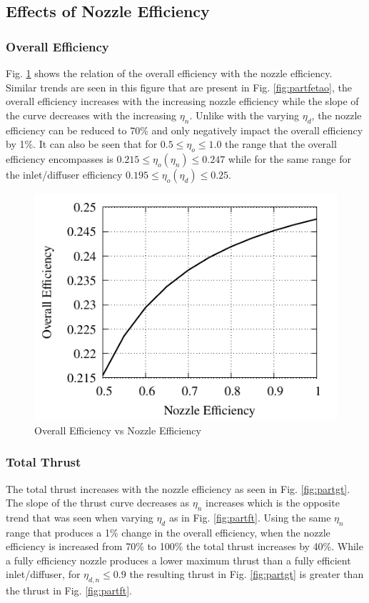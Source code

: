 \documentclass[conf]{new-aiaa} %
\begin{document}
\subsection{Effects of Nozzle Efficiency} %

\subsubsection{Overall Efficiency}
Fig. \ref{fig:partgetao} shows the relation of the overall efficiency with the nozzle efficiency. Similar trends are seen in this figure that are present in Fig. \ref{fig:partfetao}, the overall efficiency increases with the increasing nozzle efficiency while the slope of the curve decreases with the increasing $\eta_n$. Unlike with the varying $\eta_d$, the nozzle efficiency can be reduced to 70\% and only negatively impact the overall efficiency by 1\%. It can also be seen that for $0.5\leq\eta_o\leq1.0$ the range that the overall efficiency encompasses is $0.215\leq\eta_o\left(\eta_n\right)\leq0.247$ while for the same range for the inlet/diffuser efficiency $0.195\leq\eta_o\left(\eta_d\right)\leq0.25$.

\begin{figure}[H] %
    \centering
    \includegraphics[]{media/performance_parameter_files/part_g_eta_o.pdf}
    \caption{\label{fig:partgetao}Overall Efficiency vs Nozzle Efficiency}
\end{figure}

\subsubsection{Total Thrust}
The total thrust increases with the nozzle efficiency as seen in Fig. \ref{fig:partgt}. The slope of the thrust curve decreases as $\eta_n$ increases which is the opposite trend that was seen when varying $\eta_d$ as in Fig. \ref{fig:partft}. Using the same $\eta_n$ range that produces a 1\% change in the overall efficiency, when the nozzle efficiency is increased from 70\% to 100\% the total thrust increases by 40\%. While a fully efficiency nozzle produces a lower maximum thrust than a fully efficient inlet/diffuser, for $\eta_{d,n}\leq0.9$ the resulting thrust in Fig. \ref{fig:partgt} is greater than the thrust in Fig. \ref{fig:partft}.
\end{document}
